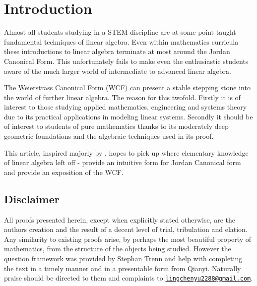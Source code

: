 \section*{Introduction}

Almost all students studying in a STEM discipline are at some point taught fundamental techniques of linear algebra.
Even within mathematics curricula these introductions to linear algebra terminate at most around the Jordan Canonical Form. This unfortunately fails to make even the enthusiastic students aware of the much larger world of intermediate to advanced linear algebra.

The Weierstrass Canonical Form (WCF) can present a stable stepping stone into the world of further linear algebra.
The reason for this twofold. Firstly it is of interest to those studying applied mathematics, engineering and systems theory due to its practical applications in modeling linear systems.
Secondly it should be of interest to students of pure mathematics thanks to its moderately deep geometric foundations and the algebraic techniques used in its proof.

This article, inspired majorly by \cite{berger2012quasi}, hopes to pick up where elementary knowledge of linear algebra left off - provide an intuitive form for Jordan Canonical form and provide an exposition of the WCF.


\subsection*{Disclaimer}
All proofs presented herein, except when explicitly stated otherwise, are the authors creation and the result of a decent level of trial, tribulation and elation.
Any similarity to existing proofs arise, by perhaps the most beautiful property of mathematics, from the structure of the objects being studied.
However the question framework was provided by Stephan Trenn and help with completing the text in a timely manner and in a presentable form from Qianyi.
Naturally praise should be directed to them and complaints to \href{mailto:lingchenyu2288@gmail.com}{\texttt{lingchenyu2288@gmail.com}}.